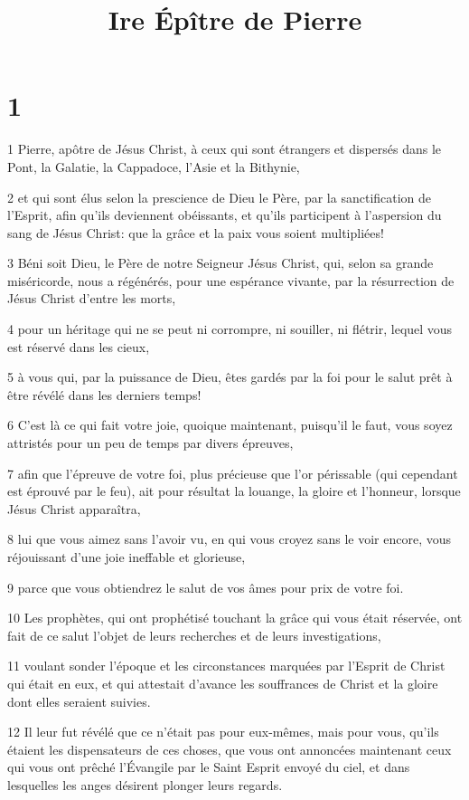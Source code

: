 

\title{Ire Épître de Pierre}


\chapter{1}

\par 1 Pierre, apôtre de Jésus Christ, à ceux qui sont étrangers et dispersés dans le Pont, la Galatie, la Cappadoce, l'Asie et la Bithynie,
\par 2 et qui sont élus selon la prescience de Dieu le Père, par la sanctification de l'Esprit, afin qu'ils deviennent obéissants, et qu'ils participent à l'aspersion du sang de Jésus Christ: que la grâce et la paix vous soient multipliées!
\par 3 Béni soit Dieu, le Père de notre Seigneur Jésus Christ, qui, selon sa grande miséricorde, nous a régénérés, pour une espérance vivante, par la résurrection de Jésus Christ d'entre les morts,
\par 4 pour un héritage qui ne se peut ni corrompre, ni souiller, ni flétrir, lequel vous est réservé dans les cieux,
\par 5 à vous qui, par la puissance de Dieu, êtes gardés par la foi pour le salut prêt à être révélé dans les derniers temps!
\par 6 C'est là ce qui fait votre joie, quoique maintenant, puisqu'il le faut, vous soyez attristés pour un peu de temps par divers épreuves,
\par 7 afin que l'épreuve de votre foi, plus précieuse que l'or périssable (qui cependant est éprouvé par le feu), ait pour résultat la louange, la gloire et l'honneur, lorsque Jésus Christ apparaîtra,
\par 8 lui que vous aimez sans l'avoir vu, en qui vous croyez sans le voir encore, vous réjouissant d'une joie ineffable et glorieuse,
\par 9 parce que vous obtiendrez le salut de vos âmes pour prix de votre foi.
\par 10 Les prophètes, qui ont prophétisé touchant la grâce qui vous était réservée, ont fait de ce salut l'objet de leurs recherches et de leurs investigations,
\par 11 voulant sonder l'époque et les circonstances marquées par l'Esprit de Christ qui était en eux, et qui attestait d'avance les souffrances de Christ et la gloire dont elles seraient suivies.
\par 12 Il leur fut révélé que ce n'était pas pour eux-mêmes, mais pour vous, qu'ils étaient les dispensateurs de ces choses, que vous ont annoncées maintenant ceux qui vous ont prêché l'Évangile par le Saint Esprit envoyé du ciel, et dans lesquelles les anges désirent plonger leurs regards.
